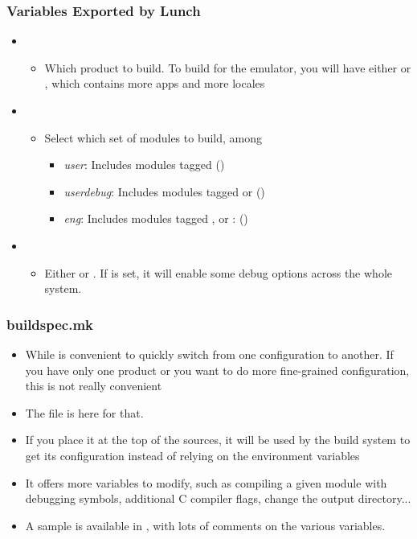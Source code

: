 \begin{frame}
  \frametitle{Variables Exported by Lunch}
  \begin{itemize}
  \item {}
    \begin{itemize}
    \item Which product to build. To build for the emulator, you will
      have either  or , which contains more
      apps and more locales
    \end{itemize}
  \item {}
    \begin{itemize}
    \item Select which set of modules to build, among
      \begin{itemize}
      \item \emph{user}: Includes modules tagged 
        ()
      \item \emph{userdebug}: Includes modules tagged  or
         ()
      \item \emph{eng}: Includes modules tagged , 
        or : ()
      \end{itemize}
    \end{itemize}
  \item {}
    \begin{itemize}
    \item Either  or . If  is
      set, it will enable some debug options across the whole system.
    \end{itemize}
  \end{itemize}
\end{frame}

\begin{frame}
  \frametitle{buildspec.mk}
  \begin{itemize}
  \item While  is convenient to quickly switch from one
    configuration to another. If you have only one product or
    you want to do more fine-grained configuration, this is not
    really convenient
  \item The file  is here for that.
  \item If you place it at the top of the sources, it will be used by
    the build system to get its configuration instead of relying on
    the environment variables
  \item It offers more variables to modify, such as compiling a
    given module with debugging symbols, additional C compiler
    flags, change the output directory...
  \item A sample is available in ,
    with lots of comments on the various variables.
  \end{itemize}
\end{frame}
